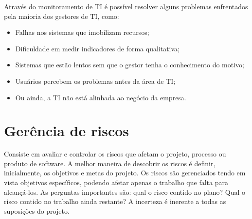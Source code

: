 \documentclass[12pt]{article}
\begin{document}
         \begin{table}[h]
            \centering
             \label{table:riscos_futuros}
            \caption{Riscos Futuros}
        \end{table}
        \FloatBarrier
        
        Através do monitoramento de TI é possível resolver alguns problemas enfrentados pela maioria dos gestores de TI, como:
        \begin{itemize}
               \item Falhas nos sistemas que imobilizam recursos;
               \item Dificuldade em medir indicadores de forma qualitativa;
                \item Sistemas que estão lentos sem que o gestor tenha o conhecimento do motivo;
                \item Usuários percebem os problemas antes da área de TI;
                \item Ou ainda, a TI não está alinhada ao negócio da empresa.
             \end{itemize}
    
    \section{Gerência de riscos}
        Consiste em avaliar e controlar os riscos que afetam o projeto, processo ou produto de software. A melhor maneira de descobrir os riscos é definir, inicialmente, os objetivos e metas do projeto. Os riscos são gerenciados tendo em vista objetivos específicos, podendo afetar apenas o trabalho que falta para alcançá-los. As perguntas importantes são: qual o risco contido no plano? Qual o risco contido no trabalho ainda restante? A incerteza é inerente a todas as suposições do projeto.	 
        
\end{document}
